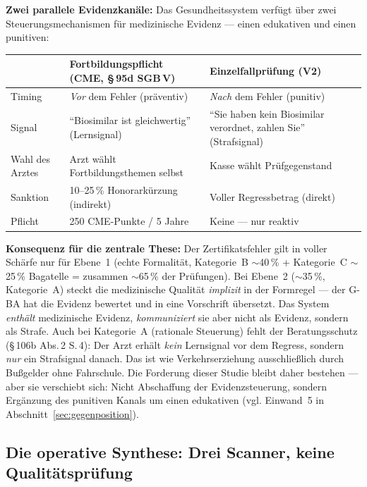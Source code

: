 \documentclass{umbruch-position}
\begin{document}
\medskip
\noindent\textbf{Zwei parallele Evidenzkanäle:} Das Gesundheitssystem verfügt über zwei Steuerungsmechanismen für medizinische Evidenz --- einen edukativen und einen punitiven:

\medskip
{\small
\begin{tabularx}{\textwidth}{p{3cm} X X}
\toprule
& \textbf{Fortbildungspflicht (CME, \S\,95d SGB\,V)} & \textbf{Einzelfallprüfung (V2)} \\
\midrule
Timing & \textit{Vor} dem Fehler (präventiv) & \textit{Nach} dem Fehler (punitiv) \\
Signal & ``Biosimilar ist gleichwertig'' (Lernsignal) & ``Sie haben kein Biosimilar verordnet, zahlen Sie'' (Strafsignal) \\
Wahl des Arztes & Arzt wählt Fortbildungsthemen selbst & Kasse wählt Prüfgegenstand \\
Sanktion & 10--25\,\% Honorarkürzung (indirekt) & Voller Regressbetrag (direkt) \\
Pflicht & 250 CME-Punkte / 5 Jahre & Keine --- nur reaktiv \\
\bottomrule
\end{tabularx}
}

\medskip
\noindent\textbf{Konsequenz für die zentrale These:} Der Zertifikatsfehler gilt in voller Schärfe nur für Ebene~1 (echte Formalität, Kategorie~B ${\sim}$40\,\% + Kategorie~C ${\sim}$25\,\% Bagatelle = zusammen ${\sim}$65\,\% der Prüfungen). Bei Ebene~2 (${\sim}$35\,\%, Kategorie~A) steckt die medizinische Qualität \textit{implizit} in der Formregel --- der G-BA hat die Evidenz bewertet und in eine Vorschrift übersetzt. Das System \textit{enthält} medizinische Evidenz, \textit{kommuniziert} sie aber nicht als Evidenz, sondern als Strafe. Auch bei Kategorie~A (rationale Steuerung) fehlt der Beratungsschutz (\S\,106b Abs.\,2 S.\,4): Der Arzt erhält \textit{kein} Lernsignal vor dem Regress, sondern \textit{nur} ein Strafsignal danach. Das ist wie Verkehrserziehung ausschließlich durch Bußgelder ohne Fahrschule. Die Forderung dieser Studie bleibt daher bestehen --- aber sie verschiebt sich: Nicht Abschaffung der Evidenzsteuerung, sondern Ergänzung des punitiven Kanals um einen edukativen (vgl. Einwand~5 in Abschnitt~\ref{sec:gegenposition}).

\subsection{Die operative Synthese: Drei Scanner, keine Qualitätsprüfung}
\label{sec:drei-scanner}
\end{document}
